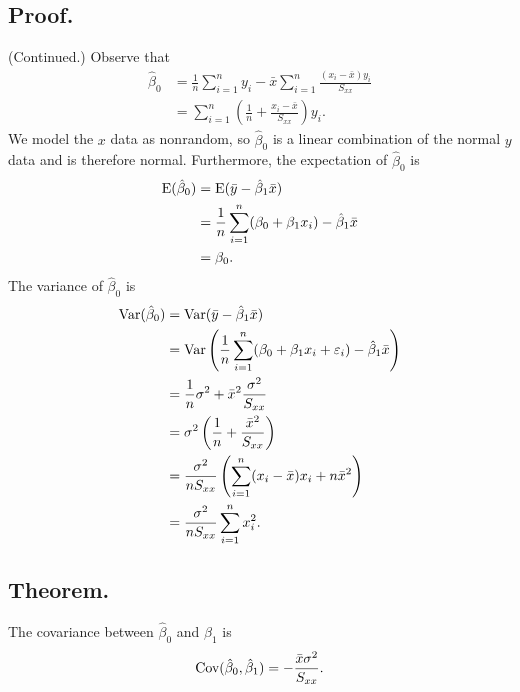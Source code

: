 \documentclass[titlepage]{article}
\begin{document}
\subsection{Proof.} (Continued.) Observe that 
\begin{align*}
    \hat{\beta}_{0} &= \frac{1}{n}\sum_{i=1}^{n}y_{i} - \bar{x}\sum_{i=1}^{n}\frac{(x_{i}-\bar{x})y_{i}}{S_{xx}} \\
                    &= \sum_{i=1}^{n}\left(\frac{1}{n} + \frac{x_{i}-\bar{x}}{S_{xx}}\right)y_{i}.
\end{align*}
We model the $x$ data as nonrandom, so $\hat{\beta}_{0}$ is a linear combination of the normal $y$ data and is therefore normal. Furthermore, the expectation of $\hat{\beta}_{0}$ is
\begin{align*}
    \text{E}(\hat{\beta}_{0}) &= \text{E}(\bar{y} - \hat{\beta}_{1}\bar{x}) \\
                        &= \frac{1}{n}\sum_{i=1}^{n}(\beta_{0} + \beta_{1}x_{i}) - \hat{\beta}_{1}\bar{x} \\
                        &= \beta_{0}.
\end{align*}
The variance of $\hat{\beta}_{0}$ is
\begin{align*}
    \text{Var}(\hat{\beta}_{0}) &= \text{Var}(\bar{y} - \hat{\beta}_{1}\bar{x}) \\
                          &= \text{Var}\left(\frac{1}{n}\sum_{i=1}^{n}(\beta_{0} + \beta_{1}x_{i} + \varepsilon_{i}) - \hat{\beta}_{1}\bar{x}\right) \\
                          &= \frac{1}{n}\sigma^{2} + \bar{x}^{2}\frac{\sigma^{2}}{S_{xx}} \\
                          &= \sigma^{2}\left(\frac{1}{n} + \frac{\bar{x}^{2}}{S_{xx}}\right) \\
                          &= \frac{\sigma^{2}}{nS_{xx}}\left(\sum_{i=1}^{n}(x_{i}-\bar{x})x_{i} + n\bar{x}^{2}\right) \\
                          &= \frac{\sigma^{2}}{nS_{xx}}\sum_{i=1}^{n}x_{i}^{2}.
\end{align*}

\subsection{Theorem.} The covariance between $\hat{\beta}_{0}$ and $\hat{\beta}_{1}$ is 
$$\text{Cov}(\hat{\beta}_{0}, \hat{\beta}_{1}) = -\frac{\bar{x}\sigma^{2}}{S_{xx}}.$$
\end{document}
